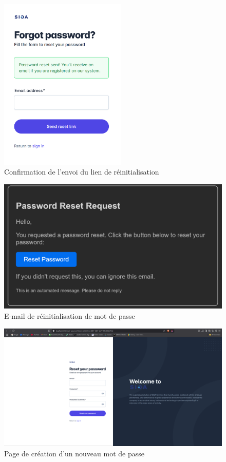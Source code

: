 \begin{figure}[!h]
\vspace{-1cm}
    \centering
    \includegraphics[width=6cm]{images/realisation/reset2.png}
    \caption{Confirmation de l'envoi du lien de réinitialisation}
    \label{fig:reset_success}
\end{figure}

\begin{figure}[h]
    \centering
    \includegraphics[width=16cm]{images/realisation/reset3.png}
    \caption{E-mail de réinitialisation de mot de passe}
    \label{fig:email_reset}
\end{figure}

\begin{figure}[h]
    \centering
    \includegraphics[width=16cm]{images/realisation/reset4.png}
    \caption{Page de création d'un nouveau mot de passe}
    \label{fig:reset_password}
\end{figure}
\clearpage
